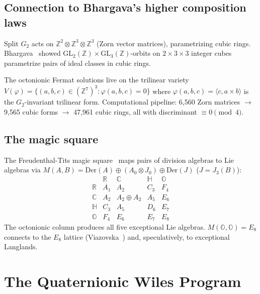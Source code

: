 \documentclass[11pt]{amsart}
\theoremstyle{plain}
\theoremstyle{definition}
\theoremstyle{remark}
\newcommand{\Z}{\mathbb{Z}}
\newcommand{\R}{\mathbb{R}}
\newcommand{\C}{\mathbb{C}}
\newcommand{\HH}{\mathbb{H}}
\newcommand{\OO}{\mathbb{O}}
\newcommand{\GL}{\mathrm{GL}}
\begin{document}
\subsection{Connection to Bhargava's higher composition laws}

Split $G_2$ acts on $\Z^2 \otimes \Z^3 \otimes \Z^3$ (Zorn vector matrices),
parametrizing cubic rings.
Bhargava~\cite{Bhargava2004} showed $\GL_2(\Z) \times \GL_3(\Z)$-orbits
on $2 \times 3 \times 3$ integer cubes parametrize pairs of ideal classes in cubic rings.

The octonionic Fermat solutions live on the trilinear variety
$V(\varphi) = \{ (a, b, c) \in (\Z^7)^3 : \varphi(a, b, c) = 0 \}$
where $\varphi(a, b, c) = \langle c, a \times b \rangle$ is the $G_2$-invariant
trilinear form.
Computational pipeline: 6{,}560 Zorn matrices $\to$ 9{,}565 cubic forms
$\to$ 47{,}961 cubic rings, all with discriminant $\equiv 0 \pmod{4}$.

\subsection{The magic square}

The Freudenthal-Tits magic square~\cite{FreudenthalTits} maps pairs of
division algebras to Lie algebras via
$M(A, B) = \mathrm{Der}(A) \oplus (A_0 \otimes J_0) \oplus \mathrm{Der}(J)$
($J = J_3(B)$):
\[
\begin{array}{c|cccc}
  & \R & \C & \HH & \OO \\ \hline
  \R & A_1 & A_2 & C_3 & F_4 \\
  \C & A_2 & A_2 \oplus A_2 & A_5 & E_6 \\
  \HH & C_3 & A_5 & D_6 & E_7 \\
  \OO & F_4 & E_6 & E_7 & E_8
\end{array}
\]
The octonionic column produces all five exceptional Lie algebras.
$M(\OO, \OO) = E_8$ connects to the $E_8$ lattice
(Viazovska~\cite{Viazovska2017}) and, speculatively, to exceptional Langlands.


\section{The Quaternionic Wiles Program}\label{sec:qwiles}
\end{document}
